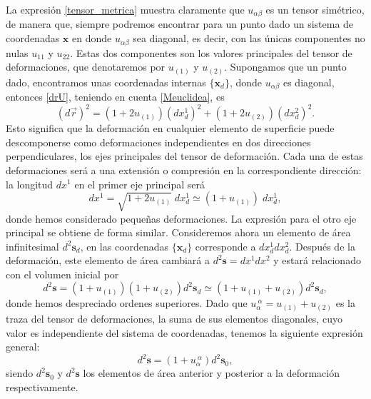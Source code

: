 La expresión \eqref{tensor_metrica} muestra claramente que $u_{\alpha\beta}$
es un tensor simétrico, de manera que, siempre 
podremos encontrar para un punto dado un sistema de coordenadas $\mathbf{x}$ en donde
$u_{\alpha\beta}$ sea diagonal, es decir, con las únicas componentes no nulas
$u_{11}$ y $u_{22}$. Estas dos componentes son los valores
principales del tensor de deformaciones, que denotaremos por $u_{(1)}$ y
$u_{(2)}$. Supongamos que un punto dado, encontramos unas coordenadas internas
$\{\mathbf{x}_d\}$, donde $u_{\alpha\beta}$ es diagonal, entonces \eqref{drU},
teniendo en cuenta \eqref{Meuclidea}, es 
\begin{equation*}
(d\vec{r})^2=(1+2u_{(1)})(dx_d^{1})^2+(1+2u_{(2)})(dx_d^{2})^2.
\end{equation*}
Esto significa que la deformación en cualquier elemento de superficie puede
descomponerse como deformaciones independientes en dos direcciones
perpendiculares, los ejes principales del tensor de deformación. Cada una de
estas deformaciones será a una extensión o compresión en la correspondiente
dirección: la longitud $dx^1$ en el primer eje principal será
\begin{equation*}
dx^1=\sqrt{1+2u_{(1)}}\; dx^1_d\simeq (1+u_{(1)})\; dx^1_d,
\end{equation*}
donde hemos considerado pequeñas deformaciones. La expresión para el otro eje
principal se obtiene de forma similar. Consideremos ahora un elemento
de área infinitesimal $d^2\mathbf{s}_d$, en las coordenadas $\{\mathbf{x}_d\}$
corresponde a $dx_d^1dx_d^2$. Después de la deformación, este elemento de área
cambiará a $d^2\mathbf{s}=dx^1dx^2$ y estará relacionado con el volumen inicial por
\begin{equation*}
d^2\mathbf{s}=(1+u_{(1)})(1+u_{(2)})d^2\mathbf{s}_d\simeq (1+u_{(1)}+u_{(2)})d^2\mathbf{s}_d,
\end{equation*}
donde hemos despreciado ordenes superiores. Dado que
$u_{\alpha}^{\ \alpha}=u_{(1)}+u_{(2)}$ es la traza del tensor de deformaciones, la
suma de sus elementos diagonales, cuyo valor es independiente del sistema de
coordenadas, tenemos la siguiente expresión general:
\begin{equation}\label{deformacion_area}
d^2\mathbf{s}=(1+u_{\alpha}^{\ \alpha})d^2\mathbf{s}_0,
\end{equation}
siendo $d^2\mathbf{s}_0$ y $d^2\mathbf{s}$ los elementos de área anterior y
posterior a la deformación respectivamente.

